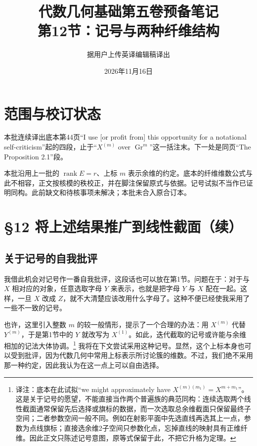 \documentclass[openany,fontset=fandol]{ctexbook}
\title{代数几何基础第五卷预备笔记\\第12节：记号与两种纤维结构}
\author{据用户上传英译编辑稿译出}
\date{2026年11月16日}
\newcommand{\note}[1]{\footnote{译注：#1}}
\begin{document}
\maketitle
\chapter*{范围与校订状态}
本批连续译出底本第44页“I use [or profit from] this opportunity for a notational self-criticism”起的四段，止于“$X^{(m)}$ over $\operatorname{Gr}^{m}$”这一括注末。下一处是同页“The Proposition 2.1”段。

本批沿用上一批的 $\operatorname{rank}E=r$、上标 $m$ 表示余维的约定。底本的纤维维数公式与此不相容，正文按核模的秩校正，并在脚注保留原式与依据。记号试拟不当作已证明同构。此前缺文和待核事项未解决；本批未合入原合订本。
\chapter*{\S12 将上述结果推广到线性截面（续）}
\section*{关于记号的自我批评}
我借此机会对记号作一番自我批评，这段话也可以放在第1节。问题在于：对于与 $X$ 相对应的对象，任意选取字母 $Y$ 来表示，也就是把字母 $Y$ 与 $X$ 配在一起。这样，一旦 $X$ 改成 $Z$，就不大清楚应该改用什么字母了。这种不便已经使我采用了一些不一致的记号。

也许，这里引入整数 $m$ 的较一般情形，提示了一个合理的办法：用 $X^{(m)}$ 代替 $Y^{(m)}$，于是第1节中的 $Y$ 就改写为 $X^{(1)}$。如此，迭代截取的记号或许能与余维相加的记法大体协调。\note{底本在此试拟“we might approximately have $X^{(m)(m_1)}=X^{m+m_1}$”。这是关于记号的愿望，不能直接当作两个普遍族的典范同构：连续选取两个线性截面通常保留先后选择或旗标的数据，而一次选取总余维截面只保留最终子空间；二者参数空间一般不同。例如在射影平面中先选直线再选其上一点，参数为点线旗标；直接选余维2子空间只参数化点，忘掉直线的映射具有正维纤维。因此正文只陈述记号意图，原等式保留于此，不把它升格为定理。}
我将在下文尝试采用这种记号。显然，这个上标本身也可以受到批评，因为代数几何中常用上标表示所讨论簇的维数。不过，我们绝不采用那一种约定，因此我认为在这一点上可以自由选择。
\end{document}
